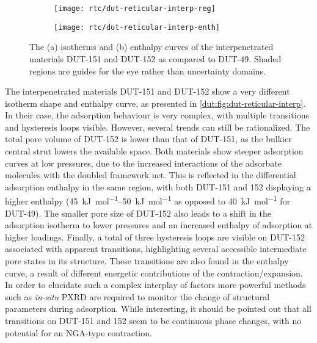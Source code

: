 \begin{figure}[htb]
    \centering
    \begin{subfigure}{0.5\linewidth}
        \texttt{[image: rtc/dut-reticular-interp-reg]}%
        \caption{}\label{dut:fig:dut-reticular-interp-reg}
    \end{subfigure}%
    \begin{subfigure}{0.5\linewidth}
        \texttt{[image: rtc/dut-reticular-interp-enth]}%
        \caption{}\label{dut:fig:dut-reticular-interp-enth}
    \end{subfigure}%
    \caption{The (a) isotherms and (b) enthalpy curves of the
    interpenetrated materials DUT-151 and DUT-152 as compared to 
    DUT-49. Shaded regions are guides for the eye rather than
    uncertainty domains.}%
    \label{dut:fig:dut-reticular-interp}
\end{figure}

The interpenetrated materials DUT-151 and DUT-152 show a very different 
isotherm shape and enthalpy curve, as presented in 
\autoref{dut:fig:dut-reticular-interp}. In their case, the adsorption
behaviour is very complex, with multiple transitions and 
hysteresis loops visible. However, several trends can still be rationalized.
The total pore volume of DUT-152 is lower than that of DUT-151, as 
the bulkier central strut lowers the available space. Both materials 
show steeper adsorption curves at low pressures, due to the increased 
interactions of the adsorbate molecules with the doubled framework
net. This is reflected in the differential adsorption enthalpy 
in the same region, with both DUT-151 and 152 displaying a higher
enthalpy (\SIrange{45}{50}{\kilo\joule\per\mol} as opposed to 
\SI{40}{\kilo\joule\per\mol} for DUT-49). The smaller pore size 
of DUT-152 also leads to a shift in the adsorption isotherm to
lower pressures and an increased enthalpy of adsorption at higher 
loadings. Finally, a total of three hysteresis loops are visible 
on DUT-152 associated with apparent transitions, highlighting several
accessible intermediate pore states in its structure. These transitions
are also found in the enthalpy curve, a result of different energetic
contributions of the contraction/expansion. In order to elucidate 
such a complex interplay of factors more powerful methods such
as \textit{in-situ} PXRD are required to monitor the change of
structural parameters during adsorption. While interesting,
it should be pointed out that all transitions on DUT-151 and 152 
seem to be continuous phase changes, with no potential for an
NGA-type contraction.

